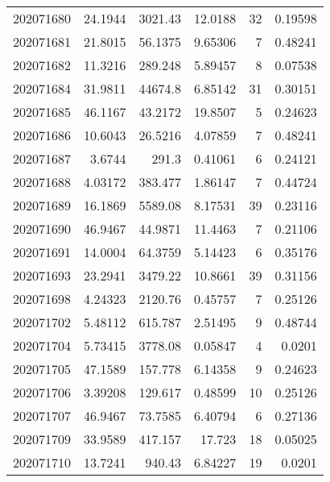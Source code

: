\begin{tabular}{rrrrrr}
 202071680 &         24.1944  &     3021.43   &           12.0188  &          32 & 0.19598 \\
 202071681 &         21.8015  &       56.1375 &            9.65306 &           7 & 0.48241 \\
 202071682 &         11.3216  &      289.248  &            5.89457 &           8 & 0.07538 \\
 202071684 &         31.9811  &    44674.8    &            6.85142 &          31 & 0.30151 \\
 202071685 &         46.1167  &       43.2172 &           19.8507  &           5 & 0.24623 \\
 202071686 &         10.6043  &       26.5216 &            4.07859 &           7 & 0.48241 \\
 202071687 &          3.6744  &      291.3    &            0.41061 &           6 & 0.24121 \\
 202071688 &          4.03172 &      383.477  &            1.86147 &           7 & 0.44724 \\
 202071689 &         16.1869  &     5589.08   &            8.17531 &          39 & 0.23116 \\
 202071690 &         46.9467  &       44.9871 &           11.4463  &           7 & 0.21106 \\
 202071691 &         14.0004  &       64.3759 &            5.14423 &           6 & 0.35176 \\
 202071693 &         23.2941  &     3479.22   &           10.8661  &          39 & 0.31156 \\
 202071698 &          4.24323 &     2120.76   &            0.45757 &           7 & 0.25126 \\
 202071702 &          5.48112 &      615.787  &            2.51495 &           9 & 0.48744 \\
 202071704 &          5.73415 &     3778.08   &            0.05847 &           4 & 0.0201  \\
 202071705 &         47.1589  &      157.778  &            6.14358 &           9 & 0.24623 \\
 202071706 &          3.39208 &      129.617  &            0.48599 &          10 & 0.25126 \\
 202071707 &         46.9467  &       73.7585 &            6.40794 &           6 & 0.27136 \\
 202071709 &         33.9589  &      417.157  &           17.723   &          18 & 0.05025 \\
 202071710 &         13.7241  &      940.43   &            6.84227 &          19 & 0.0201  \\

\end{tabular}
